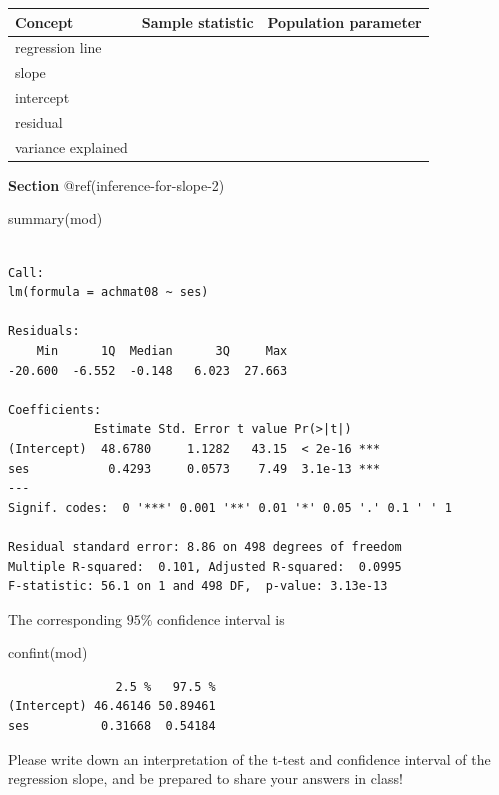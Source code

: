 \documentclass[
  letterpaper,
  DIV=11,
  numbers=noendperiod]{scrreprt}
\newenvironment{Shaded}{\begin{snugshade}}{\end{snugshade}}
\newcommand{\FunctionTok}[1]{\textcolor[rgb]{0.28,0.35,0.67}{#1}}
\newcommand{\NormalTok}[1]{\textcolor[rgb]{0.00,0.23,0.31}{#1}}
\begin{document}
\begin{longtable}[]{@{}lcc@{}}
\toprule\noalign{}
Concept & Sample statistic & Population parameter \\
\midrule\noalign{}
\endhead
\bottomrule\noalign{}
\endlastfoot
regression line & & \\
slope & & \\
intercept & & \\
residual & & \\
variance explained & & \\
\end{longtable}

\textbf{Section} @ref(inference-for-slope-2)

\begin{Shaded}
\begin{Highlighting}[]
\FunctionTok{summary}\NormalTok{(mod)}
\end{Highlighting}
\end{Shaded}

\begin{verbatim}

Call:
lm(formula = achmat08 ~ ses)

Residuals:
    Min      1Q  Median      3Q     Max 
-20.600  -6.552  -0.148   6.023  27.663 

Coefficients:
            Estimate Std. Error t value Pr(>|t|)    
(Intercept)  48.6780     1.1282   43.15  < 2e-16 ***
ses           0.4293     0.0573    7.49  3.1e-13 ***
---
Signif. codes:  0 '***' 0.001 '**' 0.01 '*' 0.05 '.' 0.1 ' ' 1

Residual standard error: 8.86 on 498 degrees of freedom
Multiple R-squared:  0.101, Adjusted R-squared:  0.0995 
F-statistic: 56.1 on 1 and 498 DF,  p-value: 3.13e-13
\end{verbatim}

The corresponding \(95\%\) confidence interval is

\begin{Shaded}
\begin{Highlighting}[]
\FunctionTok{confint}\NormalTok{(mod)}
\end{Highlighting}
\end{Shaded}

\begin{verbatim}
               2.5 %   97.5 %
(Intercept) 46.46146 50.89461
ses          0.31668  0.54184
\end{verbatim}

Please write down an interpretation of the t-test and confidence
interval of the regression slope, and be prepared to share your answers
in class!
\end{document}
